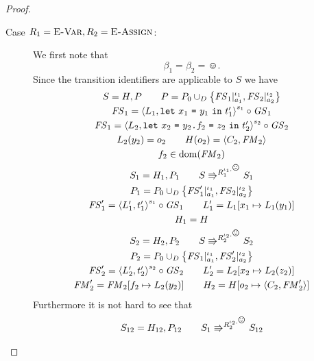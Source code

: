 \begin{proof}
\begin{description}
    \item[Case $R_1 = \mbox{{\sc E-Var}}, R_2 = \mbox{{\sc E-Assign}}$:] We first note that
      \begin{equation*}
        \beta_1 = \beta_2 = \smiley.
      \end{equation*}
      Since the transition identifiers are applicable to $S$ we have
      \begin{equation}
        \begin{gathered}
          S = H, P \andalso P = P_0 \cup_D \left\{ \FS_1|_{a_1}^{\iota_1},
          \FS_2|_{a_2}^{\iota_2} \right\} \\
          \FS_1 = \xframe{L_1, \Let{x_1}{y_1}{t'_1}}^{s_1} \circ \GS_1
          \\ 
          \FS_1 = \xframe{L_2, \Let{x_2}{\FAss{y_2}{f_2}{z_2}}{t'_2}}^{s_2}
          \circ \GS_2 \\
          L_2(y_2) = o_2 \andalso H(o_2) = \Obj{C_2, \FM_2} \\
          f_2 \in \dom(\FM_2) \\
          S_1 = H_1, P_1 \andalso S \Rrightarrow^{R_1^{\iota_1, \smiley}} S_1
          \\
          P_1 = P_0 \cup_D \left\{ \FS'_1|_{a_1}^{\iota_1},
          \FS_2|_{a_2}^{\iota_2} \right\} \\
          \FS'_1 = \xframe{L'_1, t'_1}^{s_1} \circ \GS_1  \andalso L'_1 = L_1[x_1 \mapsto
          L_1(y_1)] \\
          H_1 = H
          \\
          S_2 = H_2, P_2 \andalso S \Rrightarrow^{R_2^{\iota_2, \smiley}} S_2
          \\
          P_2 = P_0 \cup_D \left\{ \FS_1|_{a_1}^{\iota_1},
          \FS'_2|_{a_2}^{\iota_2} \right\} \\
          \FS'_2 = \xframe{L'_2, t'_2}^{s_2} \circ \GS_2  \andalso L'_2 = L_2[x_2 \mapsto
          L_2(z_2)] \\
          \FM'_2 = \FM_2[f_2 \mapsto L_2(y_2)] \andalso H_2 = H[o_2 \mapsto
          \Obj{C_2, \FM'_2}]
          \\
        \end{gathered}
      \end{equation}
      Furthermore it is not hard to see that 
      \begin{equation}
        \begin{gathered}
          S_{12} = H_{12}, P_{12} \andalso S_1 \Rrightarrow^{R_2^{\iota_2,
          \smiley}} S_{12}
          \\

\end{gathered}
\end{equation}
\end{description}
\end{proof}
